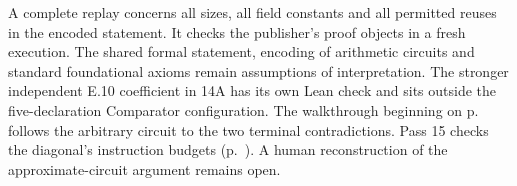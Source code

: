 A complete replay concerns all sizes, all field constants and all permitted reuses in the encoded statement. It checks the publisher's proof objects in a fresh execution. The shared formal statement, encoding of arithmetic circuits and standard foundational axioms remain assumptions of interpretation. The stronger independent E.10 coefficient in 14A has its own Lean check and sits outside the five-declaration Comparator configuration. The walkthrough beginning on p.~\pageref{sec:14chain} follows the arbitrary circuit to the two terminal contradictions. Pass 15 checks the diagonal's instruction budgets (p.~\pageref{sec:15k6}). A human reconstruction of the approximate-circuit argument remains open.


